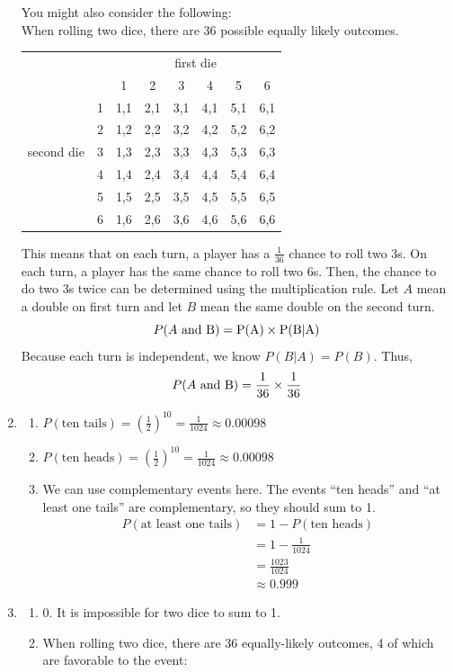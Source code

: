 \documentclass[12pt,letterpaper]{article}
\begin{document}
\begin{enumerate}
You might also consider the following:\\
 When rolling two dice, there are 36 possible equally likely outcomes.
\begin{center}
\begin{tabular}{|c c|c c c c c c|}\hline
            &   & \multicolumn{6}{|c|}{first die} \\
            &   & 1 & 2 & 3 & 4 & 5 & 6 \\ \hline
            &1  &1,1&2,1&3,1&4,1&5,1&6,1\\
            &2  &1,2&2,2&3,2&4,2&5,2&6,2\\
second die  &3  &1,3&2,3&3,3&4,3&5,3&6,3\\
            &4  &1,4&2,4&3,4&4,4&5,4&6,4\\
            &5  &1,5&2,5&3,5&4,5&5,5&6,5\\
            &6  &1,6&2,6&3,6&4,6&5,6&6,6\\ \hline
\end{tabular}
\end{center}
This means that on each turn, a player has a $\frac{1}{36}$ chance to roll two 3s. On each turn, a player has the same chance to roll two 6s. Then, the chance to do two 3s twice can be determined using the multiplication rule. Let $A$ mean a double on first turn and let $B$ mean the same double on the second turn.
$$P(A~\rm{and}~B) = P(A)\times P(B|A)$$
Because each turn is independent, we know $P(B|A)=P(B)$. Thus,
$$P(A~\rm{and}~B) = \frac{1}{36} \times \frac{1}{36}$$

\item \begin{enumerate}
\item $P(\text{ten tails}) = \left(\frac{1}{2}\right)^{10} = \frac{1}{1024} \approx 0.00098$
\item $P(\text{ten heads}) = \left(\frac{1}{2}\right)^{10} = \frac{1}{1024} \approx 0.00098$
\item We can use complementary events here. The events ``ten heads'' and ``at least one tails'' are complementary, so they should sum to 1.
\begin{align*}
P(\text{at least one tails}) &= 1-P(\text{ten heads}) \\
&= 1- \frac{1}{1024} \\
&= \frac{1023}{1024} \\
&\approx 0.999
\end{align*}
\end{enumerate}

\item \begin{enumerate}
\item 0. It is impossible for two dice to sum to 1.
\item When rolling two dice, there are 36 equally-likely outcomes, 4 of which are favorable to the event: 


\end{enumerate}
\end{enumerate}
\end{document}
